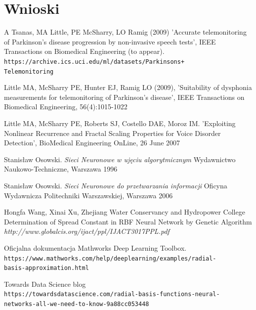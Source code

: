 \documentclass[12pt]{article}
\begin{document}
\section{Wnioski}

\newpage
\begin{thebibliography}{9}

A Tsanas, MA Little, PE McSharry, LO Ramig (2009) 
'Accurate telemonitoring of Parkinson’s disease progression by non-invasive speech tests', 
IEEE Transactions on Biomedical Engineering (to appear). 
\\\texttt{https://archive.ics.uci.edu/ml/datasets/Parkinsons+\\Telemonitoring}

Little MA, McSharry PE, Hunter EJ, Ramig LO (2009), 
'Suitability of dysphonia measurements for telemonitoring of Parkinson's disease', 
IEEE Transactions on Biomedical Engineering, 56(4):1015-1022 

Little MA, McSharry PE, Roberts SJ, Costello DAE, Moroz IM. 
'Exploiting Nonlinear Recurrence and Fractal Scaling Properties for Voice Disorder Detection', 
BioMedical Engineering OnLine, 26 June 2007

Stanisław Osowski.
\textit{Sieci Neuronowe w ujęciu algorytmicznym}
Wydawnictwo Naukowo-Techniczne, Warszawa 1996

Stanisław Osowski.
\textit{Sieci Neuronowe do przetwarzania informacji}
Oficyna Wydawnicza Politechniki Warszawskiej, Warszawa 2006

Hongfa Wang, Xinai Xu, Zhejiang
Water Conservancy and Hydropower College
Determination of Spread Constant in RBF Neural Network by Genetic
Algorithm 
\textit{http://www.globalcis.org/ijact/ppl/IJACT3017PPL.pdf}

Oficjalna dokumentacja Mathworks Deep Learning Toolbox. 
\\\texttt{https://www.mathworks.com/help/deeplearning/examples/radial-\\basis-approximation.html}

Towards Data Science blog
\\\texttt{https://towardsdatascience.com/radial-basis-functions-neural-\\networks-all-we-need-to-know-9a88cc053448}


\end{thebibliography}
\newpage

\listoffigures
\newpage
\end{document}
